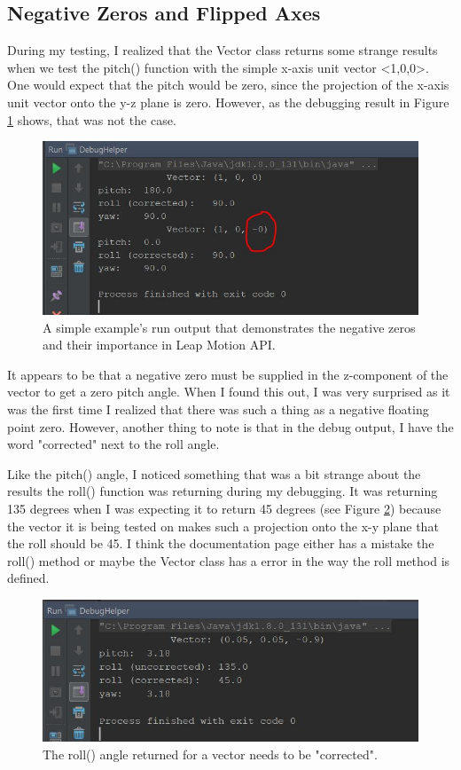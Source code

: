 \subsection{Negative Zeros and Flipped Axes}
During my testing, I realized that the Vector class returns some strange results when we test the pitch() function with the simple x-axis unit vector <1,0,0>. One would expect that the pitch would be zero, since the projection of the x-axis unit vector onto the y-z plane is zero. However, as the debugging result in Figure \ref{fig:negZero} shows, that was not the case. 
\begin{figure}[H]
\centering
\includegraphics[scale=0.35]{Figures/4_negZero.JPG}
\caption[Pitch() Debugging]{A simple example's run output that demonstrates the negative zeros and their importance in Leap Motion API.}
\label{fig:negZero}
\end{figure}

It appears to be that a negative zero must be supplied in the z-component of the vector to get a zero pitch angle. When I found this out, I was very surprised as it was the first time I realized that there was such a thing as a negative floating point zero. However,  another thing to note is that in the debug output, I have the word "corrected" next to the roll angle. 

Like the pitch() angle, I noticed something that was a bit strange about the results the roll() function was returning during my debugging. It was returning 135 degrees when I was expecting it to return 45 degrees (see Figure \ref{fig:uncorrectedRoll}) because the vector it is being tested on makes such a projection onto the x-y plane that the roll should be 45. I think the documentation page either has a mistake the roll() method or maybe the Vector class has a error in the way the roll method is defined. 
\begin{figure}[H]
\centering
\includegraphics[scale=0.35]{Figures/4_rollUncorrected.JPG}
\caption[Roll Debugging]{The roll() angle returned for a vector needs to be "corrected".}
\label{fig:uncorrectedRoll}
\end{figure}

